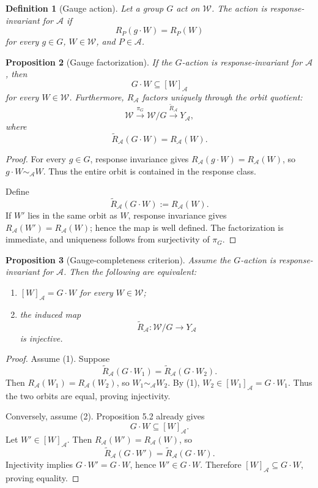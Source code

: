 \documentclass[11pt]{article}
\newtheorem{definition}{Definition}[section]
\newtheorem{proposition}[definition]{Proposition}
\newcommand{\W}{\mathcal W}
\newcommand{\Acal}{\mathcal A}
\newcommand{\RA}{R_{\mathcal A}}
\begin{document}
\begin{definition}[Gauge action]
Let a group $G$ act on $\W$.  The action is \emph{response-invariant} for
$\Acal$ if
\[
R_P(g\cdot W)=R_P(W)
\]
for every $g\in G$, $W\in\W$, and $P\in\Acal$.
\end{definition}

\begin{proposition}[Gauge factorization]
If the $G$-action is response-invariant for $\Acal$, then
\[
G\cdot W\subseteq[W]_{\Acal}
\]
for every $W\in\W$.  Furthermore, $\RA$ factors uniquely through the orbit
quotient:
\[
\W\xrightarrow{\pi_G}\W/G
\xrightarrow{\widetilde R_{\Acal}}Y_{\Acal},
\]
where
\[
\widetilde R_{\Acal}(G\cdot W)=\RA(W).
\]
\end{proposition}

\begin{proof}
For every $g\in G$, response invariance gives
$\RA(g\cdot W)=\RA(W)$, so $g\cdot W\sim_{\Acal}W$.  Thus the entire orbit is
contained in the response class.

Define
\[
\widetilde R_{\Acal}(G\cdot W):=\RA(W).
\]
If $W'$ lies in the same orbit as $W$, response invariance gives
$\RA(W')=\RA(W)$; hence the map is well defined.  The factorization is
immediate, and uniqueness follows from surjectivity of $\pi_G$.
\end{proof}

\begin{proposition}[Gauge-completeness criterion]
Assume the $G$-action is response-invariant for $\Acal$.  Then the following are
equivalent:
\begin{enumerate}
  \item $[W]_{\Acal}=G\cdot W$ for every $W\in\W$;
  \item the induced map
  \[
  \widetilde R_{\Acal}:\W/G\to Y_{\Acal}
  \]
  is injective.
\end{enumerate}
\end{proposition}

\begin{proof}
Assume (1).  Suppose
\[
\widetilde R_{\Acal}(G\cdot W_1)
=
\widetilde R_{\Acal}(G\cdot W_2).
\]
Then $\RA(W_1)=\RA(W_2)$, so $W_1\sim_{\Acal}W_2$.  By (1),
$W_2\in[W_1]_{\Acal}=G\cdot W_1$.  Thus the two orbits are equal, proving
injectivity.

Conversely, assume (2).  Proposition 5.2 already gives
\[
G\cdot W\subseteq[W]_{\Acal}.
\]
Let $W'\in[W]_{\Acal}$.  Then $\RA(W')=\RA(W)$, so
\[
\widetilde R_{\Acal}(G\cdot W')
=
\widetilde R_{\Acal}(G\cdot W).
\]
Injectivity implies $G\cdot W'=G\cdot W$, hence $W'\in G\cdot W$.  Therefore
$[W]_{\Acal}\subseteq G\cdot W$, proving equality.
\end{proof}
\end{document}
